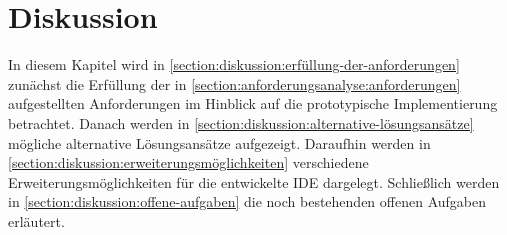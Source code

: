 \chapter{Diskussion}\label{section:diskussion}


In diesem Kapitel wird in \autoref{section:diskussion:erfüllung-der-anforderungen} zunächst die Erfüllung der in \autoref{section:anforderungsanalyse:anforderungen} aufgestellten Anforderungen im Hinblick auf die prototypische Implementierung betrachtet. Danach werden in \autoref{section:diskussion:alternative-lösungsansätze} mögliche alternative Lösungsansätze aufgezeigt. Daraufhin werden in \autoref{section:diskussion:erweiterungsmöglichkeiten} verschiedene Erweiterungsmöglichkeiten für die entwickelte IDE dargelegt. Schließlich werden in \autoref{section:diskussion:offene-aufgaben} die noch bestehenden offenen Aufgaben erläutert.




